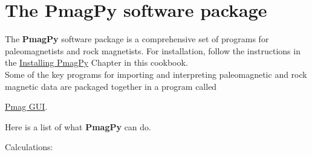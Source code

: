 \documentclass[11pt]{book}
\begin{document}
{
\chapter{The {\bf PmagPy} software package}
\label{chap:PmagPy}

The {\bf PmagPy} software package is a comprehensive set of programs for paleomagnetists and rock magnetists.  For installation,  follow the instructions in the \href{#quick_start}{Installing PmagPy} Chapter in this cookbook. \\

Some of the key programs for importing and interpreting paleomagnetic and rock magnetic data are packaged together in a program called {\href{#pmag_gui.py}{Pmag GUI}.

Here is a list of what {\bf PmagPy} can do.

Calculations:

\begin{itemize}


\end{itemize}}}
\end{document}
